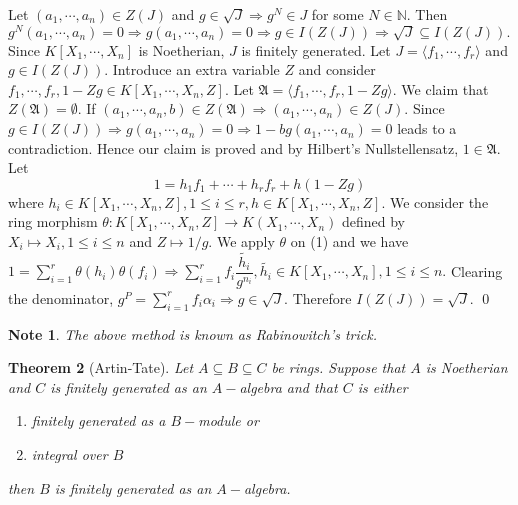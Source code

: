 \documentclass[11pt]{amsart}
\newtheorem{theorem}{Theorem}[section]
\newtheorem{note}[theorem]{Note}
\newcommand{\NN}{\mathbb N}
\newcommand{\gen}[1]{\langle#1\rangle}
\begin{document}
\proof Let $(a_1,\cdots,a_n)\in Z(J)$ and $g\in \sqrt{J} \Rightarrow g^N\in J$ for some $N\in{\NN}.$ Then $g^N(a_1,\cdots,a_n)=0 \Rightarrow g(a_1,\cdots,a_n)=0 \Rightarrow g\in I(Z(J)) \Rightarrow \sqrt{J}\subseteq I(Z(J)).$ Since $K[X_1,\cdots,X_n]$ is Noetherian, $J$ is finitely generated. Let $J=\gen{f_1,\cdots,f_r}$ and $g\in I(Z(J)).$ Introduce an extra variable $Z$ and consider $f_1,\cdots,f_r,1-Zg\in K[X_1,\cdots,X_n,Z].$ Let $\mathfrak{A}=\gen{f_1,\cdots,f_r,1-Zg}.$ We claim that $Z(\mathfrak{A})=\emptyset.$ If $(a_1,\cdots,a_n,b)\in Z(\mathfrak{A})\Rightarrow (a_1,\cdots, a_n)\in Z(J).$ Since $g\in I(Z(J)) \Rightarrow g(a_1,\cdots,a_n)=0 \Rightarrow 1-bg(a_1,\cdots,a_n)=0$ leads to a contradiction. Hence our claim is proved and by Hilbert's Nullstellensatz, $1\in\mathfrak{A}.$ Let \begin{equation}1=h_1f_1+\cdots+h_rf_r+h(1-Zg)
\end{equation} where $h_i\in K[X_1,\cdots,X_n,Z],1\leq i\leq r, h\in K[X_1,\cdots,X_n,Z].$ We consider the ring morphism $\theta:K[X_1,\cdots,X_n,Z]\to K(X_1,\cdots,X_n)$ defined by $X_i\mapsto X_i,1\leq i\leq n$ and $Z\mapsto 1/g.$ We apply $\theta$ on (1) and we have $1=\displaystyle\sum_{i=1}^r \theta(h_i)\theta(f_i) \Rightarrow \displaystyle\sum_{i=1}^r f_i\dfrac{\tilde{h_i}}{g^{n_i}},\tilde{h_i}\in K[X_1,\cdots, X_n],1\leq i\leq n.$ Clearing the denominator, $g^P=\displaystyle\sum_{i=1}^r f_i\alpha_i \Rightarrow g\in \sqrt{J}.$ Therefore $I(Z(J))=\sqrt{J}.$ \qed

\begin{note}

The above method is known as Rabinowitch's trick.

\end{note}

\begin{theorem}[Artin-Tate]

Let $A\subseteq B\subseteq C$ be rings. Suppose that $A$ is Noetherian and $C$ is finitely generated as an $A-$algebra and that $C$ is either \begin{enumerate}

\item finitely generated as a $B-$module or

\item integral over $B$
 
\end{enumerate}
then $B$ is finitely generated as an $A-$algebra.

\end{theorem}
\end{document}
